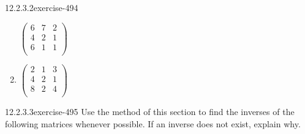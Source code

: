 \documentclass[twoside,10pt,]{book}
\numberwithin{equation}{section}
\begin{document}
\begin{divisionsolution}{12.2.3.2}{}{exercise-494}
\begin{multicols}{2}
\begin{enumerate}[label=(\alph*)]
\(\left(
\begin{array}{ccc}
6 & 7 & 2 \\
4 & 2 & 1 \\
6 & 1 & 1 \\
\end{array}
\right)\)%
\item\hypertarget{li-2035}{}\hypertarget{p-4439}{}%
\(\left(
\begin{array}{ccc}
2 & 1 & 3 \\
4 & 2 & 1 \\
8 & 2 & 4 \\
\end{array}
\right)\)%
\end{enumerate}
\end{multicols}
%
\end{divisionsolution}%
\begin{divisionsolution}{12.2.3.3}{}{exercise-495}%
\hypertarget{p-4440}{}%
Use the method of this section to find the inverses of the following matrices whenever possible. If an inverse does not exist, explain why.\leavevmode%
\end{divisionsolution}
\end{document}
